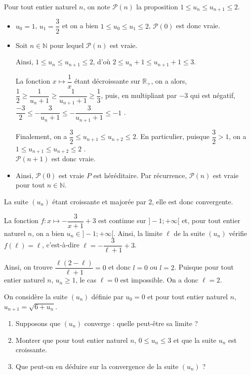 \documentclass[11pt,fleqn, openany]{book} %
\begin{document}
\begin{solution}Pour tout entier naturel $n$, on note $\mathcal{P}(n)$ la proposition  $1\leqslant u_n\leqslant u_{n+1}\leqslant 2$.
\begin{itemize}
\item $u_0=1$, $u_1=\dfrac{3}{2}$ et on a bien $1\leqslant u_0 \leqslant u_1 \leqslant 2$, $\mathcal{P}(0)$ est donc vraie.
\item Soit $n \in \mathbb{N}$ pour lequel $\mathcal{P}(n)$ est vraie. 

Ainsi, $1 \leqslant u_n \leqslant u_{n+1} \leqslant 2$, d'où $2 \leqslant u_n +1 \leqslant u_{n+1}+1 \leqslant 3$. 

La fonction $x\mapsto \dfrac{1}{x}$ étant décroissante sur $\mathbb{R}_+$, on a alors, $\dfrac{1}{2} \geqslant \dfrac{1}{u_n+1} \geqslant \dfrac{1}{u_{n+1}+1} \geqslant \dfrac{1}{3}$, puis, en multipliant par $-3$ qui est négatif, $\dfrac{-3}{2} \leqslant -\dfrac{3}{u_n+1} \leqslant -\dfrac{3}{u_{n+1}+1} \leqslant -1$ .

Finalement, on a $\dfrac{3}{2} \leqslant u_{n+1} \leqslant u_{n+2} \leqslant 2$. En particulier, puisque $\dfrac{3}{2} >1$, on a $1\leqslant u_{n+1} \leqslant u_{n+2} \leqslant 2$
. \\ $\mathcal{P}(n+1)$ est donc vraie.
\item Ainsi, $\mathcal{P}(0)$ est vraie $P$ est héréditaire. Par récurrence, $\mathcal{P}(n)$ est vraie pour tout $n\in\mathbb{N}$.
\end{itemize}

La suite $(u_n)$ étant croissante et majorée par 2, elle est donc convergente.

La fonction $f:x \mapsto -\dfrac{3}{x+1}+3$ est continue sur $]-1;+\infty [$ et, pour tout entier naturel $n$, on a bien $u_n \in ]-1 ; +\infty [$. Ainsi, la limite $\ell$ de la suite $(u_n)$ vérifie $f(\ell)=\ell$, c'est-à-dire $\ell = -\dfrac{3}{\ell + 1}+3$.

Ainsi, on trouve $\dfrac{\ell(2-\ell)}{\ell+1}=0$ et donc $l=0$ ou $l=2$. Puisque pour tout entier naturel $n$, $u_n \geqslant 1$, le cas $\ell=0$ est impossible. On a donc $\ell=2$.\end{solution}



\begin{exercise}
On considère la suite $(u_n)$ définie par $u_0=0$ et pour tout entier naturel $n$, $u_{n+1}=\sqrt{6+u_n}$.
\begin{enumerate}
\item Supposons que $(u_n)$ converge : quelle peut-être sa limite ?
\item Montrer que pour tout entier naturel $n$, $0\leqslant u_n \leqslant 3$ et que la suite $u_n$ est croissante.
\item Que peut-on en déduire sur la convergence de la suite $(u_n)$ ?
\end{enumerate}
\end{exercise}
\end{document}

